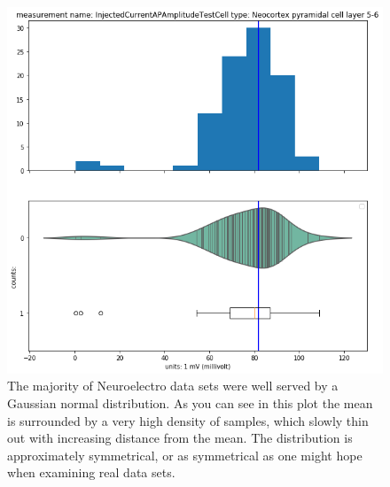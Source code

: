 \begin{figure} 
    \begin{center}
   \includegraphics[scale=0.8]{figures/mean_well_served.png}
   \caption[AP Threshold Data Distribution, Layer 5 Pyramidal Cell]{The majority of Neuroelectro data sets were well served by a Gaussian normal distribution. As you can see in this plot the mean is surrounded by a very high density of samples, which slowly thin out with increasing distance from the mean. The distribution is approximately symmetrical, or as symmetrical as one might hope when examining real data sets.}
   \label{fig:normal-feature}
    \end{center}
\end{figure}   

